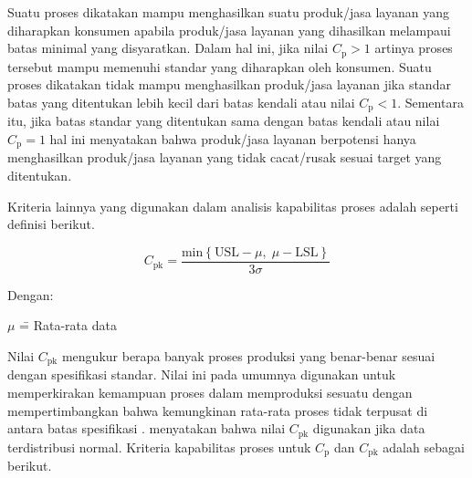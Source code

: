 Suatu proses dikatakan mampu menghasilkan suatu produk/jasa layanan yang diharapkan konsumen apabila produk/jasa layanan yang dihasilkan melampaui batas minimal yang disyaratkan. Dalam hal ini, jika nilai $C_{\mathrm{p}} > 1$ artinya proses tersebut mampu memenuhi standar yang diharapkan oleh konsumen. Suatu proses dikatakan tidak mampu menghasilkan produk/jasa layanan jika standar batas yang ditentukan lebih kecil dari batas kendali atau nilai $C_{\mathrm{p}} < 1$. Sementara itu, jika batas standar yang ditentukan sama dengan batas kendali atau nilai $C_{\mathrm{p}} = 1$ hal ini menyatakan bahwa produk/jasa layanan berpotensi hanya menghasilkan produk/jasa layanan yang tidak cacat/rusak sesuai target yang ditentukan.

Kriteria lainnya yang digunakan dalam analisis kapabilitas proses adalah seperti definisi  berikut.

\begin{equation}
    C_{\mathrm{pk}} = \frac{\text{min}\left\{\text{USL} - \mu,\; \mu - \text{LSL}\right\}}{3\sigma}
\end{equation}

\noindent Dengan: 

\begin{tabbing}
    $\mu$ \= = Rata-rata data
\end{tabbing}

Nilai $C_{\mathrm{pk}}$ mengukur berapa banyak proses produksi yang benar-benar sesuai dengan spesifikasi standar. Nilai ini pada umumnya digunakan untuk memperkirakan kemampuan proses dalam memproduksi sesuatu dengan mempertimbangkan bahwa kemungkinan rata-rata proses tidak terpusat di antara batas spesifikasi \cite{bordignon2002statistical}.  menyatakan bahwa nilai $C_{\mathrm{pk}}$ digunakan jika data terdistribusi normal. Kriteria kapabilitas proses untuk $C_{\mathrm{p}}$ dan $C_{\mathrm{pk}}$ adalah sebagai berikut.


